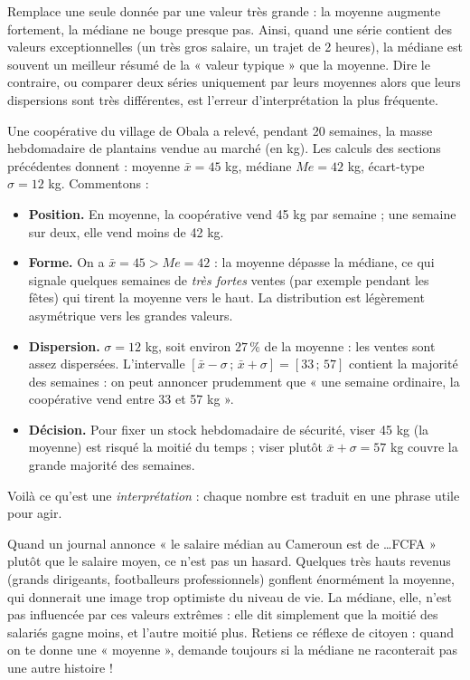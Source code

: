 \documentclass[11pt]{article}
\begin{document}
\begin{attention}
Remplace une seule donnée par une valeur très grande : la moyenne augmente fortement, la médiane ne bouge presque pas. Ainsi, quand une série contient des valeurs exceptionnelles (un très gros salaire, un trajet de 2 heures), la médiane est souvent un meilleur résumé de la « valeur typique » que la moyenne. Dire le contraire, ou comparer deux séries uniquement par leurs moyennes alors que leurs dispersions sont très différentes, est l'erreur d'interprétation la plus fréquente.
\end{attention}

\begin{exemplebox}
Une coopérative du village de Obala a relevé, pendant 20 semaines, la masse hebdomadaire de plantains vendue au marché (en kg). Les calculs des sections précédentes donnent : moyenne $\bar{x} = 45$ kg, médiane $Me = 42$ kg, écart-type $\sigma = 12$ kg. Commentons :
\begin{itemize}
\item \textbf{Position.} En moyenne, la coopérative vend 45 kg par semaine ; une semaine sur deux, elle vend moins de 42 kg.
\item \textbf{Forme.} On a $\bar{x} = 45 > Me = 42$ : la moyenne dépasse la médiane, ce qui signale quelques semaines de \emph{très fortes} ventes (par exemple pendant les fêtes) qui tirent la moyenne vers le haut. La distribution est légèrement asymétrique vers les grandes valeurs.
\item \textbf{Dispersion.} $\sigma = 12$ kg, soit environ $27\,\%$ de la moyenne : les ventes sont assez dispersées. L'intervalle $[\bar{x}-\sigma\,;\,\bar{x}+\sigma] = [33\,;\,57]$ contient la majorité des semaines : on peut annoncer prudemment que « une semaine ordinaire, la coopérative vend entre 33 et 57 kg ».
\item \textbf{Décision.} Pour fixer un stock hebdomadaire de sécurité, viser 45 kg (la moyenne) est risqué la moitié du temps ; viser plutôt $\bar{x}+\sigma = 57$ kg couvre la grande majorité des semaines.
\end{itemize}
Voilà ce qu'est une \emph{interprétation} : chaque nombre est traduit en une phrase utile pour agir.
\end{exemplebox}

\begin{savaistu}
Quand un journal annonce « le salaire médian au Cameroun est de \ldots FCFA » plutôt que le salaire moyen, ce n'est pas un hasard. Quelques très hauts revenus (grands dirigeants, footballeurs professionnels) gonflent énormément la moyenne, qui donnerait une image trop optimiste du niveau de vie. La médiane, elle, n'est pas influencée par ces valeurs extrêmes : elle dit simplement que la moitié des salariés gagne moins, et l'autre moitié plus. Retiens ce réflexe de citoyen : quand on te donne une « moyenne », demande toujours si la médiane ne raconterait pas une autre histoire !
\end{savaistu}
\end{document}

